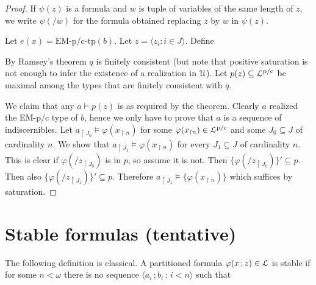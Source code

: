 \documentclass{amsproc}
\begin{document}
{\begin{proof}
  If $\psi(z)$ is a formula and $w$ is tuple of variables of the same length of $z$, we write $\psi(/w)$ for the formula obtained replacing $z$ by $w$ in $\psi(z)$.

  Let $e(x)=\mbox{EM-p/c-tp}(b)$.
  Let $z=\langle z_i:i\in J\rangle$.
  Define



  By Ramsey's theorem $q$ is finitely consistent (but note that positive saturation is not enough to infer the existence of a realization in ${\EuScript U}$).
  Let $p(z)\subseteq{\EuScript L}^{\rm p/c}$ be maximal among the types that are finitely consistent with $q$.

  We claim that any $a\models p(z)$ is as required by the theorem.
  Clearly $a$ realized the EM-p/c type of $b$, hence we only have to prove that $a$ is a sequence of indiscernibles.
  Let $a_{\restriction J_0}\models\varphi(x_{\restriction n})$ for some $\varphi(x_{\restriction n})\in{\EuScript L}^{\rm p/c}$ and some $J_0\subseteq J$ of cardinality $n$.
  We show that $a_{\restriction J_1}\models\varphi(x_{\restriction n})$ 
  for every $J_1\subseteq J$ of cardinality $n$.
  This is clear if $\varphi(/z_{\restriction J_0})$ is in $p$, so assume it is not.
  Then $\{\varphi(/z_{\restriction J_0})\}'\subseteq p$.
  Then also $\{\varphi(/z_{\restriction J_1})\}'\subseteq p$.
  Therefore  $a_{\restriction J_1}\models\{\varphi(x_{\restriction n})\}$ which suffices by saturation.
\end{proof}


\section{Stable formulas (tentative)}

\def\ceq#1#2#3{\parbox[t]{26ex}{$\displaystyle #1$}\parbox[t]{6ex}{$\displaystyle\hfil #2$}{$\displaystyle #3$}}

The following definition is classical.
A partitioned formula $\varphi(x\,;z)\in{\EuScript L}$ is stable if for some $n<\omega$ there is no sequence $\langle a_i\,;b_i\,:\,i<n\rangle$ such that 

}
\end{document}
